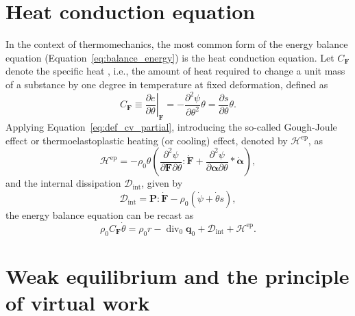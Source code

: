\section{Heat conduction equation}
\label{sec:heat-cond-equat}

In the context of thermomechanics, the most common form of the energy balance equation (Equation~\eqref{eq:balance_energy}) is the heat conduction equation.
Let \(C_{\bm F}\) denote the specific heat , i.e., the amount of heat required to change a unit mass of a substance by one degree in temperature at fixed deformation, defined as
\begin{equation} \label{eq:def_cv_partial}
  C_{\bm F}\equiv \left.\frac{\partial e}{\partial \theta}\right|_{\bm F}=-\frac{\partial^{2} \psi}{\partial \theta^{2}} \theta=\frac{\partial s}{\partial \theta} \theta.
\end{equation}
Applying Equation~\eqref{eq:def_cv_partial}, introducing the so-called Gough-Joule effect or thermoelastoplastic heating (or cooling) effect, denoted by \(\mathcal H^\text{ep}\), as
\begin{equation}
  \label{eq:def_gough_joule_effect}
  \mathcal H^\text{ep} = - \rho_0\theta\left(\frac{\partial^2 \psi}{\partial \bm{F}\partial \theta}: \dot{\bm{F}} + \frac{\partial^2 \psi}{\partial \bm{\alpha} \partial \theta}*\dot{\bm{\alpha}} \right),
\end{equation}
and the internal dissipation \(\mathcal D_\text{int}\), given by
\begin{equation}
  \mathcal D_\text{int} = \bm{P}:\dot{\bm{F}} - \rho_0(\dot \psi + \dot \theta s),
\end{equation}
the energy balance equation can be recast as
\begin{equation}
  \label{eq:heat_conduction}
  \rho_0 C_{\bm F} \dot \theta = \rho_0 r - \operatorname{div}_0 \bm{q}_0 + \mathcal D_\text{int} + \mathcal H^\text{ep}.
\end{equation}

\section{Weak equilibrium and the principle of virtual work}

